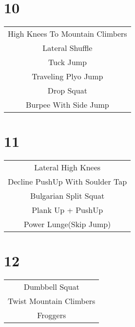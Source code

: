 \documentclass[12pt]{article}
\newcommand\myPadding{1.5}
\begin{document}
\section{10}


\begin{center}
  \bgroup
  \def\arraystretch{\myPadding}%
  \begin{tabular}{ c  }
  High Knees To Mountain Climbers
  \\
  Lateral Shuffle
  \\
  Tuck Jump
  \\
  Traveling Plyo Jump
  \\
  Drop Squat
  \\
  Burpee With Side Jump
  \end{tabular}
  \egroup
\end{center}




\section{11}


\begin{center}
  \bgroup
  \def\arraystretch{\myPadding}%
  \begin{tabular}{ c  }
  Lateral High Knees
  \\
  Decline PushUp With Soulder Tap
  \\
  Bulgarian Split Squat
  \\
  Plank Up + PushUp
  \\
  Power Lunge(Skip Jump)
  \end{tabular}
  \egroup
\end{center}





\section{12}


\begin{center}
  \bgroup
  \def\arraystretch{\myPadding}%
  \begin{tabular}{ c  }
  Dumbbell Squat
  \\
  Twist Mountain Climbers
  \\
  Froggers
  \end{tabular}
  \egroup
\end{center}
\end{document}
